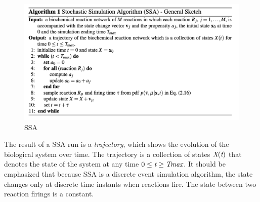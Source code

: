     \begin{figure}
      \centering
      \includegraphics[width=\textwidth]{SSA_algo.png}
      \caption{SSA}
      \label{fig:SSA}
    \end{figure}

    The result of a SSA run is a \emph{trajectory}, which shows the evolution of the biological system over time.
    The trajectory is a collection of states $\emph{X}(\emph{t})$ that denotes the state of the system at any time $0 \leq \emph{t}\geq \emph{Tmax}$.
    It should be emphasized that because SSA is a discrete event simulation algorithm, the state changes only at discrete time instants when reactions fire.
    The state between two reaction firings is a constant.
